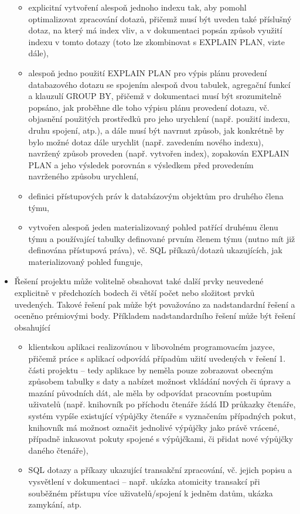 \documentclass[11pt, a4paper, titlepage]{article}
\begin{document}
\begin{itemize}
\begin{itemize}
		\item explicitní vytvoření alespoň jednoho indexu tak, aby pomohl optimalizovat zpracování dotazů, přičemž musí být uveden také příslušný dotaz, na který má index vliv, a v dokumentaci popsán způsob využití indexu v tomto dotazy (toto lze zkombinovat s EXPLAIN PLAN, vizte dále),

		\item alespoň jedno použití EXPLAIN PLAN pro výpis plánu provedení databazového dotazu se spojením alespoň dvou tabulek, agregační funkcí a klauzulí GROUP BY, přičemž v dokumentaci musí být srozumitelně popsáno, jak proběhne dle toho výpisu plánu provedení dotazu, vč. objasnění použitých prostředků pro jeho urychlení (např. použití indexu, druhu spojení, atp.), a dále musí být navrnut způsob, jak konkrétně by bylo možné dotaz dále urychlit (např. zavedením nového indexu), navržený způsob proveden (např. vytvořen index), zopakován EXPLAIN PLAN a jeho výsledek porovnán s výsledkem před provedením navrženého způsobu urychlení,

		\item definici přístupových práv k databázovým objektům pro druhého člena týmu,

		\item vytvořen alespoň jeden materializovaný pohled patřící druhému členu týmu a používající tabulky definované prvním členem týmu (nutno mít již definována přístupová práva), vč. SQL příkazů/dotazů ukazujících, jak materializovaný pohled funguje,
	\end{itemize}

	\item Řešení projektu může volitelně obsahovat také další prvky neuvedené explicitně v předchozích bodech či větší počet nebo složitost prvků uvedených. Takové řešení pak může být považováno za nadstandardní řešení a oceněno prémiovými body. Příkladem nadstandardního řešení může být řešení obsahující
	\begin{itemize}
		\item klientskou aplikaci realizovánou v libovolném programovacím jazyce, přičemž práce s aplikací odpovídá případům užití uvedených v řešení 1. části projektu – tedy aplikace by neměla pouze zobrazovat obecným způsobem tabulky s daty a nabízet možnost vkládání nových či úpravy a mazání původních dát, ale měla by odpovídat pracovním postupům uživatelů (např. knihovník po příchodu čtenáře žádá ID průkazky čtenáře, systém vypíše existující výpůjčky čtenáře s vyznačením případných pokut, knihovník má možnost označit jednolivé výpůjčky jako právě vrácené, případně inkasovat pokuty spojené s výpůjčkami, či přidat nové výpůjčky daného čtenáře),

		\item SQL dotazy a příkazy ukazující transakční zpracování, vč. jejich popisu a vysvětlení v dokumentaci – např. ukázka atomicity transakcí při souběžném přístupu více uživatelů/spojení k jedněm datům, ukázka zamykání, atp.
	\end{itemize}

\end{itemize}
\end{document}
